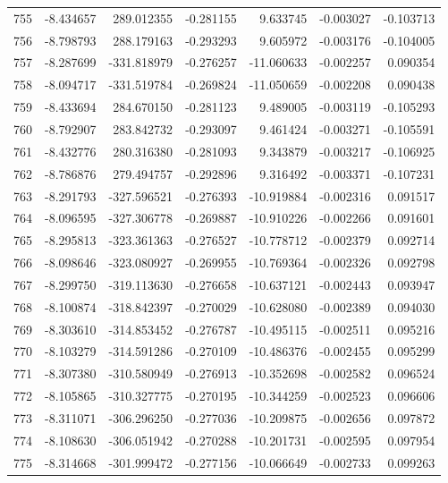 \begin{tabular}{rrrrrrr}
 755 &  -8.434657 &  289.012355 & -0.281155 &    9.633745 &   -0.003027 & -0.103713 \\
 756 &  -8.798793 &  288.179163 & -0.293293 &    9.605972 &   -0.003176 & -0.104005 \\
 757 &  -8.287699 & -331.818979 & -0.276257 &  -11.060633 &   -0.002257 &  0.090354 \\
 758 &  -8.094717 & -331.519784 & -0.269824 &  -11.050659 &   -0.002208 &  0.090438 \\
 759 &  -8.433694 &  284.670150 & -0.281123 &    9.489005 &   -0.003119 & -0.105293 \\
 760 &  -8.792907 &  283.842732 & -0.293097 &    9.461424 &   -0.003271 & -0.105591 \\
 761 &  -8.432776 &  280.316380 & -0.281093 &    9.343879 &   -0.003217 & -0.106925 \\
 762 &  -8.786876 &  279.494757 & -0.292896 &    9.316492 &   -0.003371 & -0.107231 \\
 763 &  -8.291793 & -327.596521 & -0.276393 &  -10.919884 &   -0.002316 &  0.091517 \\
 764 &  -8.096595 & -327.306778 & -0.269887 &  -10.910226 &   -0.002266 &  0.091601 \\
 765 &  -8.295813 & -323.361363 & -0.276527 &  -10.778712 &   -0.002379 &  0.092714 \\
 766 &  -8.098646 & -323.080927 & -0.269955 &  -10.769364 &   -0.002326 &  0.092798 \\
 767 &  -8.299750 & -319.113630 & -0.276658 &  -10.637121 &   -0.002443 &  0.093947 \\
 768 &  -8.100874 & -318.842397 & -0.270029 &  -10.628080 &   -0.002389 &  0.094030 \\
 769 &  -8.303610 & -314.853452 & -0.276787 &  -10.495115 &   -0.002511 &  0.095216 \\
 770 &  -8.103279 & -314.591286 & -0.270109 &  -10.486376 &   -0.002455 &  0.095299 \\
 771 &  -8.307380 & -310.580949 & -0.276913 &  -10.352698 &   -0.002582 &  0.096524 \\
 772 &  -8.105865 & -310.327775 & -0.270195 &  -10.344259 &   -0.002523 &  0.096606 \\
 773 &  -8.311071 & -306.296250 & -0.277036 &  -10.209875 &   -0.002656 &  0.097872 \\
 774 &  -8.108630 & -306.051942 & -0.270288 &  -10.201731 &   -0.002595 &  0.097954 \\
 775 &  -8.314668 & -301.999472 & -0.277156 &  -10.066649 &   -0.002733 &  0.099263 \\

\end{tabular}
